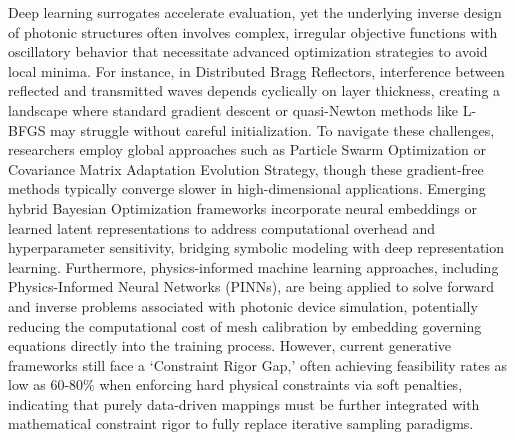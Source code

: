 Deep learning surrogates accelerate evaluation, yet the underlying inverse design of photonic structures often involves complex, irregular objective functions with oscillatory behavior that necessitate advanced optimization strategies to avoid local minima. For instance, in Distributed Bragg Reflectors, interference between reflected and transmitted waves depends cyclically on layer thickness, creating a landscape where standard gradient descent or quasi-Newton methods like L-BFGS may struggle without careful initialization. \citep{doi_10_1515_nanoph_2020_0379_1cc596ab} To navigate these challenges, researchers employ global approaches such as Particle Swarm Optimization or Covariance Matrix Adaptation Evolution Strategy, though these gradient-free methods typically converge slower in high-dimensional applications. Emerging hybrid Bayesian Optimization frameworks incorporate neural embeddings or learned latent representations to address computational overhead and hyperparameter sensitivity, bridging symbolic modeling with deep representation learning. Furthermore, physics-informed machine learning approaches, including Physics-Informed Neural Networks (PINNs), are being applied to solve forward and inverse problems associated with photonic device simulation, potentially reducing the computational cost of mesh calibration by embedding governing equations directly into the training process. However, current generative frameworks still face a `Constraint Rigor Gap,' often achieving feasibility rates as low as 60-80\% when enforcing hard physical constraints via soft penalties, indicating that purely data-driven mappings must be further integrated with mathematical constraint rigor to fully replace iterative sampling paradigms. \citep{doi_10_48550_arxiv_2602_18148_e9c0a72b} \citep{doi_10_48550_arxiv_2511_00070_bf8eda11} \citep{doi_10_48550_arxiv_2606_12337_68b62bfa}

